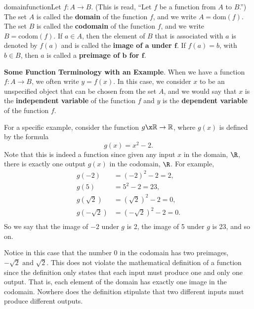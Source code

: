 \begin{defbox}{domainfunction}{Let  $f \colon A \to B$.  (This is read, ``Let  $f$  be a function from  $A$  to  $B$.'')  The set  $A$  is called the \textbf{domain}
%
%
of the function  $f$, and we write  $A = \text{dom}( f )$.\label{sym:domfunc}  The set  $B$ is called the \textbf{codomain}
%
%
of the function  $f$, and we write  $B = \text{codom}( f )$. \label{sym:codomain}
\vskip6pt
If  $a \in A$, then the element of  $B$  that is associated with  $a$  is denoted by  
$f( a )$ 
\label{sym:fofx}and is called the \textbf{image of  $\boldsymbol{a}$
%
  under  $\boldsymbol{f}$}\!.  If  $f( a ) = b$, with  $b \in B$, then  $a$  is called a 
\textbf{preimage of  $\boldsymbol{b}$
%
  for  $\boldsymbol{f}$}\!.}  
\end{defbox}
%
\noindent
\textbf{Some Function Terminology with an Example}.  When we have a function \linebreak
$f \colon A \to B$, we often write $y = f(x)$.  In this case, we consider $x$ to be an unspecified object that can be chosen from the set $A$, and we would say that  $x$  is the \textbf{independent variable}
%
%
 of the function  $f$  and  $y$  is the \textbf{dependent variable}
%
%
 of the function  $f$.

For a specific example, consider the function $g \x \mathbb{R} \to \mathbb{R}$, where  $g( x )$ is defined by the formula 
\[
g( x ) = x^2  - 2. \label{example:function}
\]
Note that this is indeed a function since given any input  $x$  in the domain, $\R$, there is exactly one output  $g( x )$ in the codomain, $\R$.  For example,
\[
\begin{aligned}
  g( { - 2} )        &= \left( { - 2} \right)^2  - 2 = 2, \\ 
  g( 5 )             &= 5^2  - 2 = 23, \\
  g( {\sqrt 2 } )    &= \left( {\sqrt 2 } \right)^2  - 2 = 0,  \\
  g( { - \sqrt 2 } ) &= \left( { - \sqrt 2 } \right)^2  - 2 = 0. \\ 
\end{aligned}
\]
So we say that the image of  $-2$ under $g$  is  2, the image of  5 under $g$ is  23, and so on.  

Notice in this case that the number  0  in the codomain has two preimages, $ - \sqrt 2 \text{ and }\sqrt 2 $.  This does not violate the mathematical definition of a function since the definition only states that each input must produce one and only one output.  That is, each element of the domain has exactly one image in the codomain.  Nowhere does the definition stipulate that two different inputs must produce different outputs.


